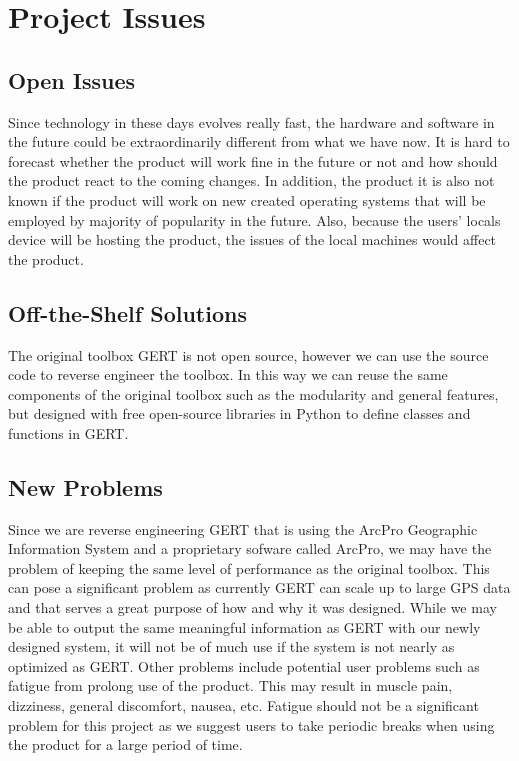 \documentclass[12pt, titlepage]{article}
\begin{document}
\newpage

\section{Project Issues}
\subsection{Open Issues}
Since technology in these days evolves really fast, the hardware and software in the future could be extraordinarily different from what we have now. It is hard to forecast whether the product will work fine in the future or not and how should the product react to the coming changes. In addition, the product it is also not known if the product will work on new created operating systems that will be employed by majority of popularity in the future. Also, because the users' locals device will be hosting the product, the issues of the local machines would affect the product.

\subsection{Off-the-Shelf Solutions}
The original toolbox GERT is not open source, however we can use the source code to reverse engineer the toolbox. In this way we can reuse the same components of the original toolbox such as the modularity and general features, but designed with free open-source libraries in Python to define classes and functions in GERT.

\subsection{New Problems}
Since we are reverse engineering GERT that is using the ArcPro Geographic Information System and a proprietary sofware called ArcPro, we may have the problem of keeping the
same level of performance as the original toolbox. This can pose a significant problem as currently GERT can scale up to large GPS data and that serves a great purpose of how and why
it was designed. While we may be able to output the same meaningful information as GERT with our newly designed system, it will not be of much use if the system is not nearly as optimized
as GERT. 
Other problems include potential user problems such as fatigue from prolong use of the product. This may result in muscle pain, dizziness, general discomfort, nausea, etc. Fatigue should not be a significant problem for this project as we suggest users to take periodic breaks when using the product for a large period of time.
\end{document}
